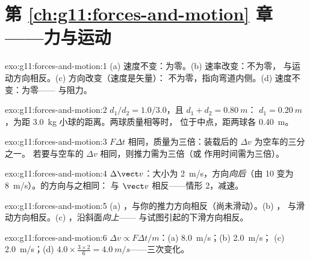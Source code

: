 \section*{第 \ref{ch:g11:forces-and-motion} 章——力与运动}

\begin{solution}{exo:g11:forces-and-motion:1}
(a) 速度不变：为零。(b) 速率改变：不为零，
与运动方向相反。(c) 方向改变（速度是矢量）：
不为零，指向弯道内侧。(d) 速度不变：为零——
与阻力。
\end{solution}

\begin{solution}{exo:g11:forces-and-motion:2}
$d_1/d_2 = 1.0/3.0$，且 $d_1 + d_2 = \qty{0.80}{m}$：
$d_1 = \qty{0.20}{m}$，为距 \qty{3.0}{kg} 小球的距离。两球质量相等时，
位于中点，距两球各 \qty{0.40}{m}。
\end{solution}

\begin{solution}{exo:g11:forces-and-motion:3}
$F\Delta t$ 相同，质量为三倍：装载后的 $\Delta v$ 为空车的三分之一。
若要与空车的 $\Delta v$ 相同，则推力需为三倍（或
作用时间需为三倍）。
\end{solution}

\begin{solution}{exo:g11:forces-and-motion:4}
$\Delta \vect v$：大小为 \qty{2}{m/s}，方向\emph{向后}（由
\num{10} 变为 \qty{8}{m/s}）。的方向与之相同：
与 $\vect v$ 相反——情形 2，减速。
\end{solution}

\begin{solution}{exo:g11:forces-and-motion:5}
(a) ，与你的推力方向相反（尚未滑动）。(b) ，
与滑动方向相反。(c) ，沿斜面\emph{向上}——
与试图引起的下滑方向相反。
\end{solution}

\begin{solution}{exo:g11:forces-and-motion:6}
$\Delta v \propto F\Delta t/m$：(a) \qty{8.0}{m/s}；(b) \qty{2.0}{m/s}；
(c) \qty{2.0}{m/s}；(d) $4.0 \times \frac{3 \times 2}{6} =
\qty{4.0}{m/s}$——三次变化。
\end{solution}

